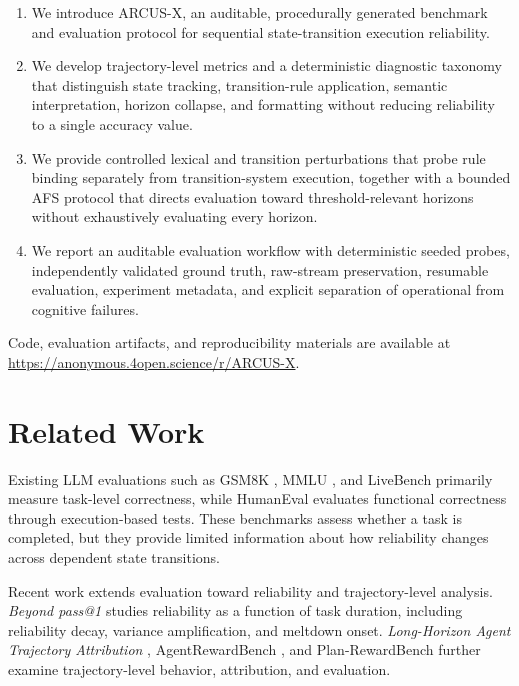 \documentclass{article}
\begin{document}
\begin{enumerate}

\item We introduce ARCUS-X, an auditable, procedurally generated benchmark and evaluation protocol for sequential state-transition execution reliability.

\item We develop trajectory-level metrics and a deterministic diagnostic taxonomy that distinguish state tracking, transition-rule application, semantic interpretation, horizon collapse, and formatting without reducing reliability to a single accuracy value.

\item We provide controlled lexical and transition perturbations that probe rule binding separately from transition-system execution, together with a bounded AFS protocol that directs evaluation toward threshold-relevant horizons without exhaustively evaluating every horizon.

\item We report an auditable evaluation workflow with deterministic seeded probes, independently validated ground truth, raw-stream preservation, resumable evaluation, experiment metadata, and explicit separation of operational from cognitive failures.
\end{enumerate}

Code, evaluation artifacts, and reproducibility materials are available at \url{https://anonymous.4open.science/r/ARCUS-X}.


\section{Related Work}

Existing LLM evaluations such as GSM8K \cite{cobbe2021gsm8k}, MMLU \cite{hendrycks2020mmlu}, and LiveBench \cite{gu2024livebench} primarily measure task-level correctness, while HumanEval \cite{chen2021evaluating} evaluates functional correctness through execution-based tests. These benchmarks assess whether a task is completed, but they provide limited information about how reliability changes across dependent state transitions.

Recent work extends evaluation toward reliability and trajectory-level analysis. \textit{Beyond pass@1} \cite{khanal2026pass1reliabilityscienceframework} studies reliability as a function of task duration, including reliability decay, variance amplification, and meltdown onset. \textit{Long-Horizon Agent Trajectory Attribution} \cite{chen2026longhorizonagenttrajectoryattribution}, AgentRewardBench \cite{lu2025agentrewardbench}, and Plan-RewardBench \cite{wang2026aligning} further examine trajectory-level behavior, attribution, and evaluation.
\end{document}
